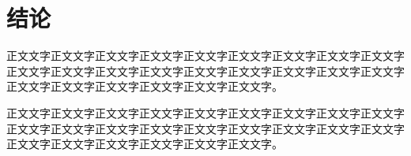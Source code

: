 

\chapter{结论}

正文文字正文文字正文文字正文文字正文文字正文文字正文文字正文文字正文文字正文文字正文文字正文文字正文文字正文文字正文文字正文文字正文文字正文文字正文文字正文文字正文文字正文文字正文文字正文文字。

正文文字正文文字正文文字正文文字正文文字正文文字正文文字正文文字正文文字正文文字正文文字正文文字正文文字正文文字正文文字正文文字正文文字正文文字正文文字正文文字正文文字正文文字正文文字正文文字。

